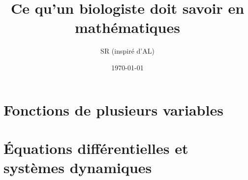 \documentclass[french, 12pt]{article}
\title{\Huge{Ce qu'un biologiste doit savoir en mathématiques}}
\author{SR (inspiré d'AL)}
\date{\today}
\numberwithin{exercise}{section}
\numberwithin{equation}{section}
\begin{document}

\maketitle


\newpage \section{Fonctions de plusieurs variables} 

\newpage \section{\'Equations différentielles et systèmes dynamiques} 


% 
% 

\end{document}
